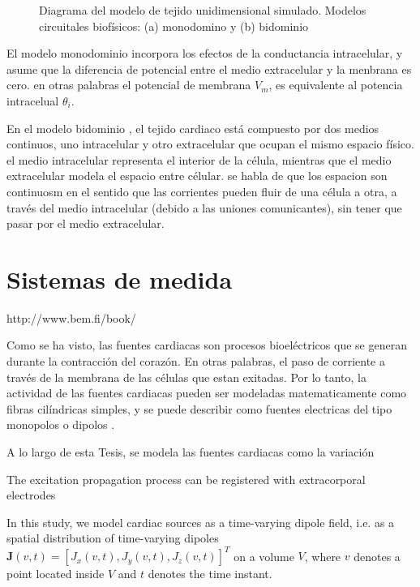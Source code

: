 \begin{figure}
\centering
\caption{Diagrama del modelo de tejido unidimensional simulado. Modelos
circuitales biofísicos: (a) monodomino y (b) bidominio}
  \label{fig:mono_bidominio}
\end{figure}


El modelo monodominio incorpora los efectos de la conductancia
intracelular, y asume que la diferencia de potencial entre el medio extracelular  y la
menbrana es cero. en otras palabras el potencial de membrana $V_m$, es equivalente al
potencia intracelual $\theta_i$.


En el modelo bidominio \cite{henriquez1992, miller1978}, el tejido cardiaco está
compuesto por dos medios continuos, uno intracelular y otro extracelular que ocupan el
mismo espacio físico. el medio intracelular representa el interior de la célula,
mientras que el medio extracelular modela el espacio entre célular. se habla de
que los espacion son continuosm en el sentido  que las corrientes pueden fluir
de una célula a otra, a través del medio intracelular (debido a las uniones
comunicantes), sin tener que pasar por el medio extracelular.





\section{Sistemas de medida}


http://www.bem.fi/book/

Como se ha visto, las fuentes cardiacas son procesos bioeléctricos que se generan
durante la contracción del corazón. En otras palabras, el paso de corriente a través de la
membrana de las células que estan exitadas. Por lo tanto, la actividad de las fuentes
cardiacas pueden ser modeladas matematicamente como fibras cilíndricas simples, y se puede describir
como fuentes electricas del tipo monopolos o dipolos  \cite{Malmivuo95}.



A lo largo de esta Tesis, se modela las fuentes cardiacas como la variación




The excitation propagation process can be registered with extracorporal
electrodes

In this study, we model cardiac sources as a
time-varying dipole field, i.e. as a spatial distribution of time-varying
dipoles $\mathbf{J}(v,t)= [J_x(v,t), J_y(v,t), J_z(v,t)]^T$ on a volume $V$,
where $v$ denotes a point located inside $V$ and $t$ denotes the time instant.

